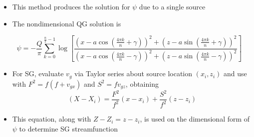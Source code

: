 \documentclass[landscape]{seminar}
\begin{document}
\begin{slide}

\begin{itemize}
\item This method produces the solution for $\psi$ due to a single source

\item The nondimensional QG solution is
\end{itemize}

\[
\ \ \ \ \psi = -\frac{Q}{\pi} \sum_{k=0}^{\frac{n}{2}-1} \log \! \left[\frac{(x-a \cos(\frac{4 \pi k}{n} + \gamma))^2 + (z-a \sin(\frac{4 \pi k}{n} + \gamma))^2}{(x-a \cos(\frac{4 \pi k}{n} - \gamma))^2 + (z-a \sin(\frac{4 \pi k}{n} - \gamma))^2}\right]
\]

\begin{itemize}
\item For SG, evaluate $v_g$ via Taylor series about source location $(x_i,z_i)$ and use with $F^2 = f(f+v_{gx})$ and $S^2 = f v_{gz}$, obtaining
\[
(X-X_i) = \frac{F^2}{f^2}(x-x_i) + \frac{S^2}{f^2} (z-z_i)
\]

\item This equation, along with $Z-Z_i = z-z_i$, is used on the dimensional form of $\psi$ to determine SG streamfunction

\end{itemize}

\end{slide}
\end{document}
